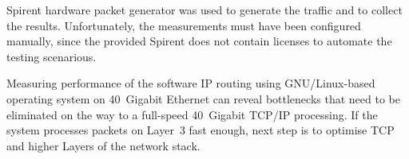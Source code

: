 Spirent hardware packet generator was used to generate the traffic and to collect the results.
Unfortunately, the measurements must have been configured manually, since the provided Spirent does not
contain licenses to automate the testing scenarious.

Measuring performance of the software IP routing using GNU/Linux-based operating system on 40~Gigabit Ethernet
can reveal bottlenecks that need to be eliminated
on the way to a full-speed 40~Gigabit TCP/IP processing.
If the system processes packets on Layer~3 fast enough,
next step is to optimise TCP and higher Layers of the network stack.
